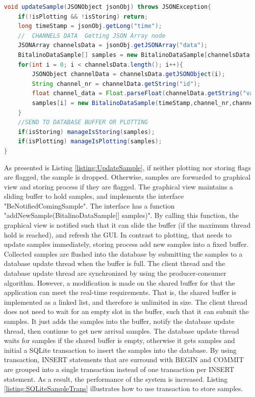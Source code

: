 \begin{minipage}{\linewidth}
\begin{lstlisting}[caption={Update real-time samples}, label = {listing:UpdateSample}, language=Java]
void updateSample(JSONObject jsonObj) throws JSONException{
    if(!isPlotting && !isStoring) return;
    long timeStamp = jsonObj.getLong("time");
    //  CHANNELS DATA  Getting JSON Array node
    JSONArray channelsData = jsonObj.getJSONArray("data");
    BitalinoDataSample[] samples = new BitalinoDataSample[channelsData.length()];
    for(int i = 0; i < channelsData.length(); i++){
        JSONObject channelData = channelsData.getJSONObject(i);
        String channel_nr = channelData.getString("id");
        float channel_data = Float.parseFloat(channelData.getString("value"));
        samples[i] = new BitalinoDataSample(timeStamp,channel_nr,channel_data);
    }
    //SEND TO DATABASE BUFFER OR PLOTTING
    if(isStoring) manageIsStoring(samples);
    if(isPlotting) manageIsPlotting(samples);
}
\end{lstlisting}
\end{minipage}
As presented is Listing \ref{listing:UpdateSample}, if neither plotting nor storing flags are flagged, the sample is dropped. Otherwise, samples are forwarded to graphical view and storing process if they are flagged. The graphical view maintains a sliding buffer to hold samples, and implements the interface "BeNotifiedComingSample". The interface has a function "addNewSample(BitalinoDataSample[] samples)". By calling this function, the graphical view is notified such that it can slide the buffer (if the maximum thread hold is reached), and refresh the GUI. In contrast to plotting, that needs to update samples immediately, storing process add new samples into a fixed buffer. Collected samples are flushed into the database by submitting the samples to a database update thread when the buffer is full. The client thread and the database update thread are synchronized by using the producer-consumer algorithm\citep{CONSUMERPRODUCER}. However, a modification is made on the shared buffer for that the application can meet the real-time requirements. That is, the shared buffer is implemented as a linked list, and therefore is unlimited in size. The client thread does not need to wait for an empty slot in the buffer, such that it can submit the samples. It just adds the samples into the buffer, notify the database update thread, then continue to get new arrival samples. The database update thread waits for samples if the shared buffer is empty, otherwise it gets samples and initial a SQLite transaction to insert the samples into the database. By using transaction, INSERT statements that are surround with BEGIN and COMMIT are grouped into a single transaction instead of one transaction per INSERT statement. As a result, the performance of the system is increased. Listing \ref{listing:SQLiteSampleTrans} illustrates how to use transaction to store samples.\\
